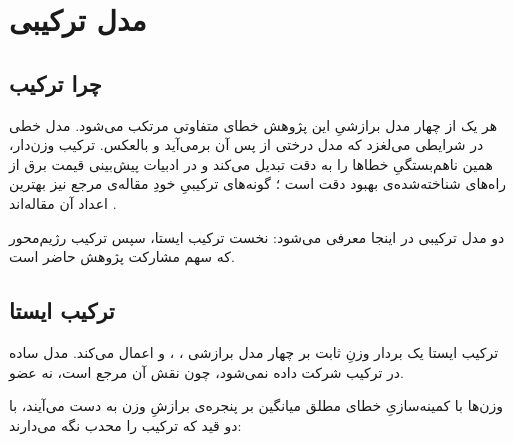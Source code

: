 
\section{مدل ترکیبی}
\label{sec:3-8}

\subsection*{چرا ترکیب}

هر یک از چهار مدل برازشیِ این پژوهش خطای متفاوتی مرتکب می‌شود. مدل خطی در شرایطی
می‌لغزد که مدل درختی از پس آن برمی‌آید و بالعکس. ترکیب وزن‌دار، همین ناهم‌بستگیِ
خطاها را به دقت تبدیل می‌کند و در ادبیات پیش‌بینی قیمت برق از راه‌های شناخته‌شده‌ی
بهبود دقت است \cite{jiang_review_2018}؛ گونه‌های ترکیبیِ خودِ مقاله‌ی مرجع نیز بهترین
اعداد آن مقاله‌اند \cite{lago_forecasting_2021}.

دو مدل ترکیبی در اینجا معرفی می‌شود: نخست ترکیب ایستا، سپس ترکیب رژیم‌محور که سهم
مشارکت پژوهش حاضر است.

\subsection*{ترکیب ایستا}

ترکیب ایستا یک بردار وزنِ ثابت بر چهار مدل برازشی  ،
،  و   اعمال می‌کند. مدل ساده در ترکیب
شرکت داده نمی‌شود، چون نقش آن مرجع است، نه عضو.

وزن‌ها با کمینه‌سازیِ خطای مطلق میانگین بر پنجره‌ی برازشِ وزن به دست می‌آیند، با دو قید
که ترکیب را محدب نگه می‌دارند:

